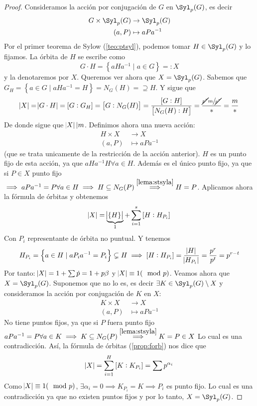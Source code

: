 \begin{proof}
    Consideramos la acción por conjugación de $G$ en $\Syl_p(G)$, es decir
    \[
        \begin{aligned}
            G \times \Syl_p(G) &\to \Syl_p(G) \\
            (a, P) &\mapsto aPa^{-1}
        \end{aligned}
    \]
    Por el primer teorema de Sylow (\ref{teo:ptsyl}), podemos tomar $H \in \Syl_p(G)$ y lo fijamos.
    La órbita de $H$ se escribe como
    \[
        G \cdot H = \left\{ aHa^{-1} \mid a \in G \right\} =\colon X
    \]
    y la denotaremos por $X$. Queremos ver ahora que $X = \Syl_p(G)$. Sabemos que $G_H =
    \left\{ a \in G \mid aHa^{-1} = H \right\} = N_G(H) = \supseteq H$. Y sigue que
    \[
        \abs{X} = \abs{G \cdot H} = \left[ G : G_H \right] = \left[ G : N_G(H) \right] =
        \frac{\left[ G : H \right]}{\left[ N_G(H) : H \right]} = 
        \frac{\sfrac{\cancel{p^r}m}{\cancel{p^r}}}{\ast} = \frac{m}{\ast}
    \]
    De donde sigue que $\abs{X} \vert m$. Definimos ahora una nueva acción:
    \[
        \begin{aligned}
            H \times X &\to X \\
            (a, P) &\mapsto aPa^{-1}
        \end{aligned}
    \]
    (que se trata unicamente de la restricción de la acción anterior). $H$ es un punto fijo de esta acción,
    ya que $aHa^{-1} H \forall a \in H$. Además es el único punto fijo, ya que si $P \in X$ punto fijo
    $\implies aPa^{-1} = P \forall a \in H \implies H \subseteq N_G(P) 
    \stackrel{\ref{lema:stsyla}}{\implies} H = P$. Aplicamos ahora la fórmula de órbitas y obtenemos
    \[
        \abs{X} = \underbrace{\abs{ \left\{ H \right\} }}_{1} +
        \sum^s_{i=1} \left[ H : H_{P_i} \right]
    \]
    Con $P_i$ representante de órbita no puntual. Y tenemos
    \[
        H_{P_i} = \left\{ a \in H \mid aP_ia^{-1} = P_i \right\} \subsetneq H \implies
        \left[ H : H_{P_i} \right] = \frac{\abs{H}}{\abs{H_{P_i}}} = \frac{p^r}{p^t} = p^{r-t}
    \]
    Por tanto:
    $\abs{X} = 1 + \sum \dot{p} = 1 + p \beta$ y $\abs{X} \equiv 1 (\mod p)$. Veamos ahora que
    $X = \Syl_p(G)$. Suponemos que no lo es, es decir $\exists K \in \Syl_p(G) \setminus X$ y consideramos
    la acción por conjugación de $K$ en $X$:
    \[
        \begin{aligned}
            K \times X &\to X \\
            (a, P) &\mapsto aPa^{-1}
        \end{aligned}
    \]
    No tiene puntos fijos, ya que si $P$ fuera punto fijo $aPa^{-1} = P \forall a \in K \implies
    K \subseteq N_G(P) \stackrel{\ref{lema:stsyla}}{\implies} K = P \in X$ Lo cual es una contradicción.
    Así, la fórmula de órbitas (\ref{prop:forb}) nos dice que
    \[
        \abs{X} = \sum^H_{i = 1} \left[ K : K_{P_i} \right] = \sum p^{\alpha_i}
    \]
    Como $\abs{X} \equiv 1 (\mod p)$, $\exists \alpha_i = 0 \implies K_{P_i} = K \implies P_i$ es punto fijo.
    Lo cual es una contradicción ya que no existen puntos fijos y por lo tanto, $X = \Syl_p(G)$.


\end{proof}

